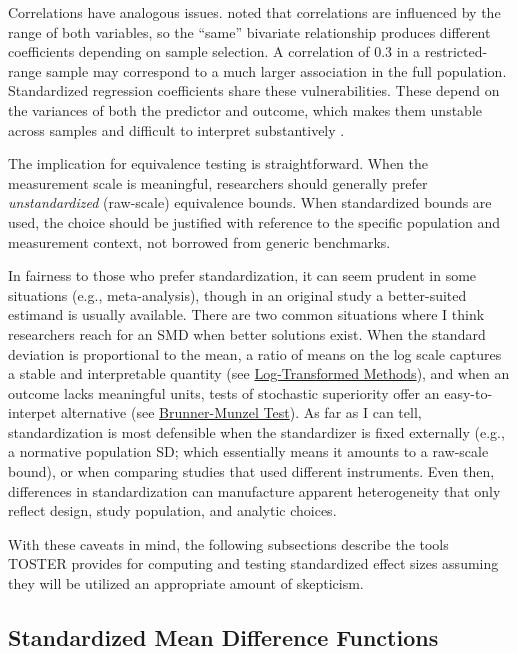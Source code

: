 \documentclass[]{interact}
\theoremstyle{plain}%
\theoremstyle{definition}
\theoremstyle{remark}
\begin{document}
Correlations have analogous issues. \citet{tukey1969} noted that
correlations are influenced by the range of both variables, so the
``same'' bivariate relationship produces different coefficients
depending on sample selection. A correlation of 0.3 in a
restricted-range sample may correspond to a much larger association in
the full population. Standardized regression coefficients share these
vulnerabilities. These depend on the variances of both the predictor and
outcome, which makes them unstable across samples and difficult to
interpret substantively \citep{greenland1991}.

The implication for equivalence testing is straightforward. When the
measurement scale is meaningful, researchers should generally prefer
\emph{unstandardized} (raw-scale) equivalence bounds. When standardized
bounds are used, the choice should be justified with reference to the
specific population and measurement context, not borrowed from generic
benchmarks.

In fairness to those who prefer standardization, it can seem prudent in
some situations (e.g., meta-analysis), though in an original study a
better-suited estimand is usually available. There are two common
situations where I think researchers reach for an SMD when better
solutions exist. When the standard deviation is proportional to the
mean, a ratio of means on the log scale captures a stable and
interpretable quantity (see
\hyperref[log-transformed-methods]{Log-Transformed Methods}), and when
an outcome lacks meaningful units, tests of stochastic superiority offer
an easy-to-interpet alternative (see
\hyperref[brunner-munzel-test]{Brunner-Munzel Test}). As far as I can
tell, standardization is most defensible when the standardizer is fixed
externally (e.g., a normative population SD; which essentially means it
amounts to a raw-scale bound), or when comparing studies that used
different instruments. Even then, differences in standardization can
manufacture apparent heterogeneity that only reflect design, study
population, and analytic choices.

With these caveats in mind, the following subsections describe the tools
TOSTER provides for computing and testing standardized effect sizes
assuming they will be utilized an appropriate amount of skepticism.

\subsection{Standardized Mean Difference
Functions}\label{standardized-mean-difference-functions}
\end{document}
